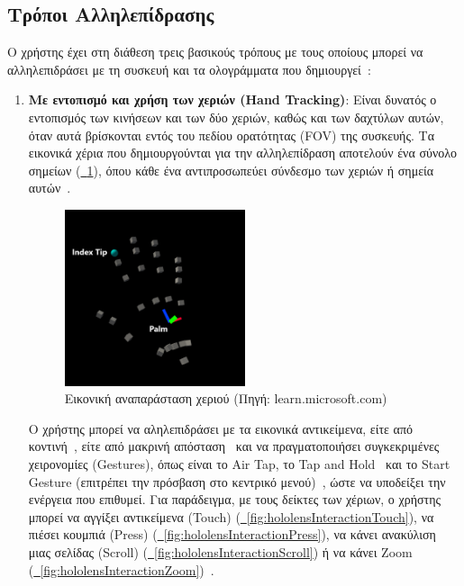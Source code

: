 \subsection{Τρόποι Αλληλεπίδρασης}\label{subsec:hololensInteraction}
Ο χρήστης έχει στη διάθεση τρεις βασικούς τρόπους με τους οποίους μπορεί να αλληλεπιδράσει με τη συσκευή και τα ολογράμματα που δημιουργεί~\cite{scooley_2023_hololens}:
\begin{enumerate}
    \item \textbf{Με εντοπισμό και χρήση των χεριών (Hand Tracking)}: Είναι δυνατός ο εντοπισμός των κινήσεων και των δύο χεριών, καθώς και των δαχτύλων αυτών, όταν αυτά βρίσκονται εντός του πεδίου ορατότητας (FOV) της συσκευής. Τα εικονικά χέρια που δημιουργούνται για την αλληλεπίδραση αποτελούν ένα σύνολο σημείων (\hyperref[fig:handRepresentation]{\schema~\ref*{fig:handRepresentation}}), όπου κάθε ένα αντιπροσωπεύει σύνδεσμο των χεριών ή σημεία αυτών~\cite{keveleigh_2022_hand}.
    
    \begin{figure}[!hb]
        \centering
        \includegraphics[width=0.5\textwidth]{images/holographic_hand.png}
        \caption{Εικονική αναπαράσταση χεριού {\footnotesize (Πηγή: learn.microsoft.com)}}\label{fig:handRepresentation}
    \end{figure}
    
    Ο χρήστης μπορεί να αληλεπιδράσει με τα εικονικά αντικείμενα, είτε από κοντινή~\cite{caseymeekhof_2022_direct}, είτε από μακρινή απόσταση~\cite{caseymeekhof_2022_point} και να πραγματοποιήσει συγκεκριμένες χειρονομίες (Gestures), όπως είναι το Air Tap, το Tap and Hold~\cite{sostel_2023_gaze} και το Start Gesture (επιτρέπει την πρόσβαση στο κεντρικό μενού)~\cite{shengkait_2022_start}, ώστε να υποδείξει την ενέργεια που επιθυμεί. Για παράδειγμα, με τους δείκτες των χέριων, ο χρήστης μπορεί να αγγίξει αντικείμενα (Touch) (\hyperref[fig:hololensInteractionTouch]{\schema~\ref*{fig:hololensInteractionTouch}}), να πιέσει κουμπιά (Press) (\hyperref[fig:hololensInteractionPress]{\schema~\ref*{fig:hololensInteractionPress}}), να κάνει ανακύλιση μιας σελίδας (Scroll) (\hyperref[fig:hololensInteractionScroll]{\schema~\ref*{fig:hololensInteractionScroll}}) ή να κάνει Zoom (\hyperref[fig:hololensInteractionZoom]{\schema~\ref*{fig:hololensInteractionZoom}})~\cite{caseymeekhof_2022_direct}.
    

\end{enumerate}

